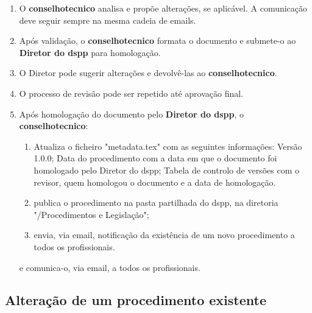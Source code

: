 \begin{enumerate}
  \item O \textbf{\gls{conselhotecnico}} analisa e propõe alterações, se aplicável. A comunicação deve seguir sempre na mesma cadeia de emails.
  \item Após validação, o \textbf{\gls{conselhotecnico}} formata o documento e submete-o ao \textbf{Diretor do \gls{dspp}} para homologação.
  \item O Diretor pode sugerir alterações e devolvê-las ao \textbf{\gls{conselhotecnico}}.
  \item O processo de revisão pode ser repetido até aprovação final.
  \item Após homologação do documento pelo \textbf{Diretor do \gls{dspp}}, o \textbf{\gls{conselhotecnico}}:
  \begin{enumerate}
    \item Atualiza o ficheiro "metadata.tex" com as seguintes informações: Versão 1.0.0; Data do procedimento com a data em que o documento foi homologado pelo Diretor do \gls{dspp}; Tabela de controlo de versões com o revisor, quem homologou o documento e a data de homologação.
    \item publica o procedimento na pasta partilhada do \gls{dspp}, na diretoria "/Procedimentos e Legislação";
    \item envia, via email, notificação da existência de um novo procedimento a todos os profissionais.
  \end{enumerate}
  
   e comunica-o, via email, a todos os profissionais.
\end{enumerate}

\subsection{Alteração de um procedimento existente}

